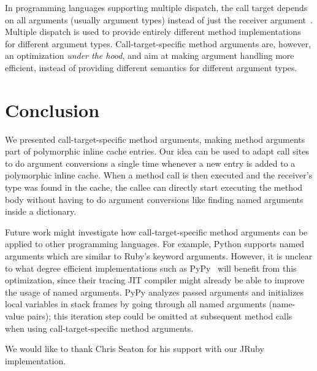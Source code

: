 \documentclass{sigplanconf} %
\begin{document}
In programming languages supporting multiple dispatch, the call target depends on all arguments (usually argument types) instead of just the receiver argument~\cite{multimethods}. Multiple dispatch is used to provide entirely different method implementations for different argument types. Call-target-specific method arguments are, however, an optimization \emph{under the hood}, and aim at making argument handling more efficient, instead of providing different semantics for different argument types.

\section{Conclusion}
We presented call-target-specific method arguments, making method arguments part of polymorphic inline cache entries. Our idea can be used to adapt call sites to do argument conversions a single time whenever a new entry is added to a polymorphic inline cache. When a method call is then executed and the receiver's type was found in the cache, the callee can directly start executing the method body without having to do argument conversions like finding named arguments inside a dictionary.

Future work might investigate how call-target-specific method arguments can be applied to other programming languages. For example, Python supports named arguments which are similar to Ruby's keyword arguments. However, it is unclear to what degree efficient implementations such as PyPy~\cite{Bolz:2009:TMP:1565824.1565827} will benefit from this optimization, since their tracing JIT compiler might already be able to improve the usage of named arguments. PyPy analyzes passed arguments and initializes local variables in stack frames by going through all named arguments (name-value pairs); this iteration step could be omitted at subsequent method calls when using call-target-specific method arguments.

\acks
We would like to thank Chris Seaton for his support with our JRuby implementation.

%

%
%
\end{document}
